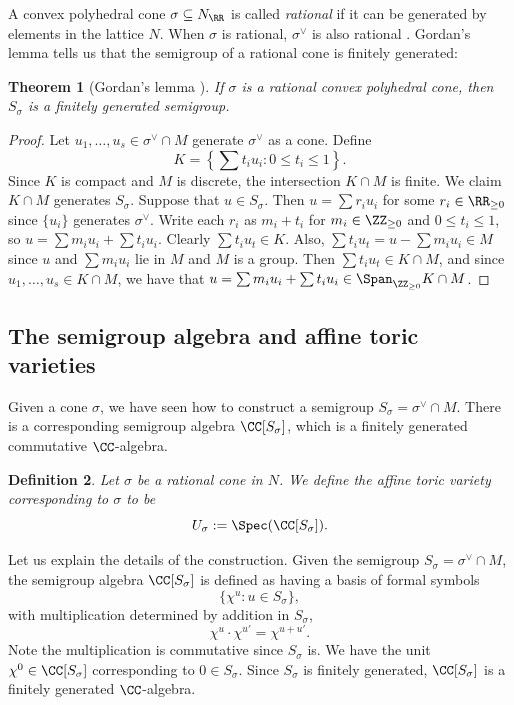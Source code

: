 \documentclass[12pt]{amsart}
\theoremstyle{plain}
\newtheorem{theorem}{Theorem}%
\newtheorem{definition}[theorem]{Definition}
\begin{document}
A convex polyhedral cone $\sigma \subseteq N_\RR$ is called \emph{rational} if it can be generated by elements in the lattice $N$.
When $\sigma$ is rational, $\sigma^\vee$ is also rational \cite[\S 1.2]{Fulton93}.
Gordan's lemma tells us that the semigroup of a rational cone is finitely generated:

\begin{theorem}[Gordan's lemma {\cite[\S 1.2]{Fulton93}}]\label{gordanslemma}
If $\sigma$ is a rational convex polyhedral cone, then $S_\sigma$ is a finitely generated semigroup.
\end{theorem}
\begin{proof}
Let $u_1, \ldots, u_s \in \sigma^\vee \cap M$ generate $\sigma^\vee$ as a cone.
Define
$$K = \left\{\sum t_i u_i : 0 \le t_i \le 1\right\}.$$
Since $K$ is compact and $M$ is discrete, the intersection $K \cap M$ is finite.
We claim $K \cap M$ generates $S_\sigma$.
Suppose that $u \in S_\sigma$.
Then $u = \sum r_i u_i$ for some $r_i \in \RR_{\ge 0}$ since $\{u_i\}$ generates $\sigma^\vee$.
Write each $r_i$ as $m_i + t_i$ for $m_i \in \ZZ_{\ge 0}$ and $0 \le t_i \le 1$, so $u = \sum m_i u_i + \sum t_i u_i$.
Clearly $\sum t_i u_t \in K$.
Also, $\sum t_i u_t = u - \sum m_i u_i \in M$ since $u$ and $\sum m_i u_i$ lie in $M$ and $M$ is a group.
Then $\sum t_i u_t \in K \cap M$, and since $u_1, \ldots, u_s \in K \cap M$, we have that $u = \sum m_i u_i + \sum t_i u_i \in \Span_{\ZZ_{\ge 0}} K \cap M$.
\end{proof}

\subsection{The semigroup algebra and affine toric varieties}
Given a cone $\sigma$, we have seen how to construct a semigroup $S_\sigma = \sigma^\vee \cap M$.
There is a corresponding semigroup algebra $\CC[S_\sigma]$, which is a finitely generated commutative $\CC$-algebra.

\begin{definition}
Let $\sigma$ be a rational cone in $N$.
We define the affine toric variety corresponding to $\sigma$ to be
$$U_\sigma := \Spec(\CC[S_\sigma]).$$
\end{definition}

Let us explain the details of the construction.
Given the semigroup $S_\sigma = \sigma^\vee \cap M$, the semigroup algebra $\CC[S_\sigma]$ is defined as having a basis of formal symbols
$$\{\chi^u : u \in S_\sigma\},$$
with multiplication determined by addition in $S_\sigma$,
$$\chi^u \cdot \chi^{u'} = \chi^{u + u'}.$$
Note the multiplication is commutative since $S_\sigma$ is.
We have the unit $\chi^0 \in \CC[S_\sigma]$ corresponding to $0 \in S_\sigma$.
Since $S_\sigma$ is finitely generated, $\CC[S_\sigma]$ is a finitely generated $\CC$-algebra.
\end{document}
